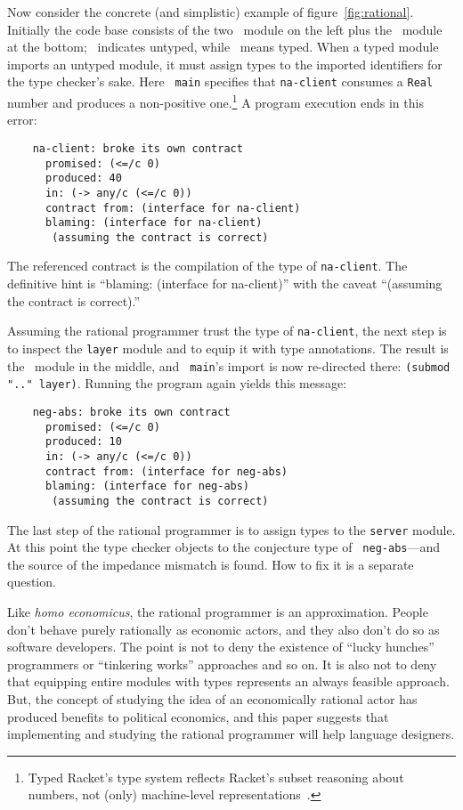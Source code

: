 Now consider the concrete (and simplistic) example of figure~\ref{fig:rational}.
Initially the code base consists of the two \dyncolor\ module on the left plus
the \typecolor\ module at the bottom; \dyncolor\ indicates untyped, while
\typecolor\ means typed. When a typed module imports an untyped module, it must
assign types to the imported identifiers for the type checker's sake. Here {\tt
main} specifies that {\tt na-client} consumes a {\tt Real} number and produces a
non-positive one.\footnote{Typed Racket's type system reflects Racket's subset
reasoning about numbers, not (only) machine-level
representations~\cite{stathff-padl-12}.} A program execution ends in this error:
\begin{verbatim}
    na-client: broke its own contract
      promised: (<=/c 0)
      produced: 40
      in: (-> any/c (<=/c 0))           
      contract from: (interface for na-client)
      blaming: (interface for na-client)
       (assuming the contract is correct)
\end{verbatim}
The referenced contract is the compilation of the type of {\tt na-client}. The
definitive hint is ``blaming: (interface for na-client)'' with the caveat
``(assuming the contract is correct).''

Assuming the rational programmer trust the type of {\tt na-client}, the next
step is to inspect the {\tt layer} module and to equip it with type
annotations. The result is the \typecolor\ module in the middle, and {\tt
main}'s import is now re-directed there: {\tt (submod ".." layer)}. Running the
program again yields this message:
\begin{verbatim}
    neg-abs: broke its own contract
      promised: (<=/c 0)
      produced: 10
      in: (-> any/c (<=/c 0))
      contract from: (interface for neg-abs)
      blaming: (interface for neg-abs)
       (assuming the contract is correct)
\end{verbatim}
The last step of the rational programmer is to assign types to the {\tt server}
module. At this point the type checker objects to the conjecture type of {\tt
neg-abs}---and the source of the impedance mismatch is found. How to fix it is a
separate question.

Like {\it homo economicus\/}, the rational programmer is an
approximation.  People don't behave purely rationally as economic
actors, and they also don't do so as software developers. The point is
not to deny the existence of ``lucky hunches'' programmers or
``tinkering works'' approaches and so on. It is also not to deny that
equipping entire modules with types represents an always feasible
approach.  But, the concept of studying the idea of an economically
rational actor has produced benefits to political economics, and this
paper suggests that implementing and studying the rational programmer
will help language designers.
